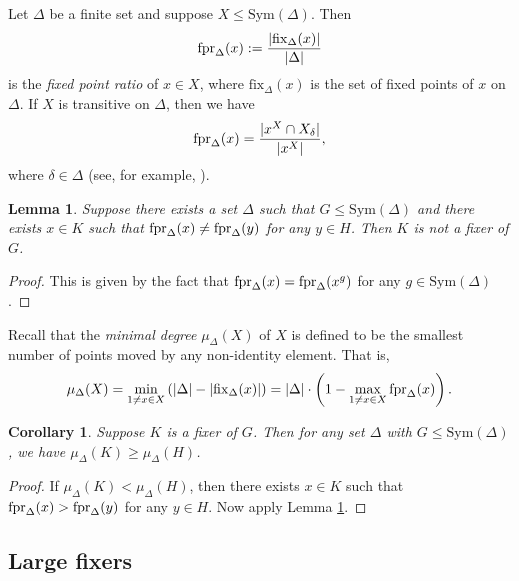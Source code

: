 \documentclass[twoside,a4paper,reqno,11pt]{amsart}
\newcommand{\<}{\langle}
\renewcommand{\>}{\rangle}
\newcommand{\leqs}{\leqslant}
\newcommand{\geqs}{\geqslant}
\newcommand{\fpr}{\mbox{{\rm fpr}}}
\newcommand{\fix}{\mathrm{fix}}
\newtheorem{lem}[thm]{Lemma}
\newtheorem{cor}[thm]{Corollary}
\theoremstyle{definition}
\begin{document}
	Let $\Delta$ be a finite set and suppose $X\leqs\mathrm{Sym}(\Delta)$. Then
	\begin{equation*}
	\fpr_\Delta(x):=\frac{|\fix_\Delta(x)|}{|\Delta|}
	\end{equation*}
	is the \textit{fixed point ratio} of $x\in X$, where $\fix_\Delta(x)$ is the set of fixed points of $x$ on $\Delta$. If $X$ is transitive on $\Delta$, then we have
	\begin{equation*}
	\fpr_\Delta(x) = \frac{|x^X\cap X_\delta|}{|x^X|},
	\end{equation*}
	where $\delta\in \Delta$ (see, for example, \cite[Lemma 1.2(iii)]{B_fpr_survey}).
	
	\begin{lem}
		\label{l:pre_fpr}
		Suppose there exists a set $\Delta$ such that $G\leqs\mathrm{Sym}(\Delta)$ and there exists $x\in K$ such that $\fpr_\Delta(x)\ne \fpr_\Delta(y)$ for any $y\in H$. Then $K$ is not a fixer of $G$.
	\end{lem}
	
	\begin{proof}
		This is given by the fact that $\fpr_\Delta(x) = \fpr_\Delta(x^g)$ for any $g\in \mathrm{Sym}(\Delta)$.
	\end{proof}
	
	Recall that the \textit{minimal degree} $\mu_\Delta(X)$ of $X$ is defined to be the smallest number of points moved by any non-identity element. That is,
	\begin{equation*}
	\mu_\Delta(X) = \min_{1\ne x\in X}\left(|\Delta|-|\fix_\Delta(x)|\right) = |\Delta|\cdot\left(1-\max_{1\ne x\in X}\fpr_\Delta(x)\right).
	\end{equation*}
	
	\begin{cor}
		\label{c:pre_min_deg}
		Suppose $K$ is a fixer of $G$. Then for any set $\Delta$ with $G\leqs\mathrm{Sym}(\Delta)$, we have $\mu_\Delta(K)\geqs \mu_\Delta(H)$.
	\end{cor}
	
	\begin{proof}
		If $\mu_\Delta(K) < \mu_\Delta(H)$, then there exists $x\in K$ such that $\fpr_\Delta(x) > \fpr_\Delta(y)$ for any $y\in H$. Now apply Lemma \ref{l:pre_fpr}.
	\end{proof}
	
	
	
	
	
	
	\subsection{Large fixers}
	
\end{document}
